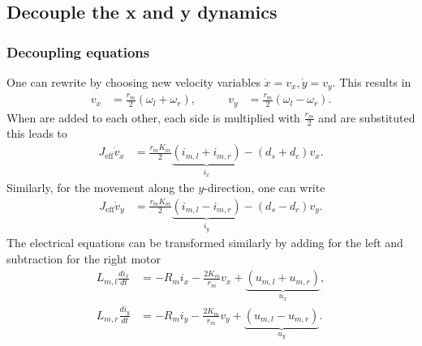 \documentclass[a4paper,11pt]{article}
\begin{document}
\subsection{Decouple the x and y dynamics}

\subsubsection{Decoupling equations}
One can rewrite  by choosing new velocity variables $\dot{x}=v_x,\dot{y}=v_y$. This results in 
\begin{equation}
\begin{aligned}
    v_x &= \frac{r_m}{2} \left(\omega_l + \omega_r\right),
    &\qquad
    v_y &= \frac{r_m}{2} \left(\omega_l - \omega_r\right)\label{eq:speed}.
\end{aligned}
\end{equation}
When  are added to each other, each side is multiplied with $\frac{r_m}{2}$ and  are substituted this leads to 
\begin{align}
    J_{\text{eff}}\dot{v}_x &= \frac{r_m K_m}{2}\underbrace{\left(i_{m,l}+i_{m,r}\right)}_{i_x}-\left(d_s+d_c\right)v_x.
\end{align}
Similarly, for the movement along the $y$-direction, one can write
\begin{align}
    J_{\text{eff}}\dot{v}_y &= \frac{r_m K_m}{2}\underbrace{\left(i_{m,l}-i_{m,r}\right)}_{i_y}-\left(d_s-d_c\right)v_y.
\end{align}
The electrical equations can be transformed similarly by adding  for the left and subtraction for the right motor
\begin{align}
    L_{m,l}\frac{d i_x}{dt} &= -R_m i_x - \frac{2K_m}{r_m}v_x + \underbrace{\left(u_{m,l}+u_{m,r}\right)}_{u_x},\\
    L_{m,r}\frac{d i_y}{dt} &= -R_m i_y - \frac{2K_m}{r_m}v_y + \underbrace{\left(u_{m,l}-u_{m,r}\right)}_{u_y}.
\end{align}
\end{document}
